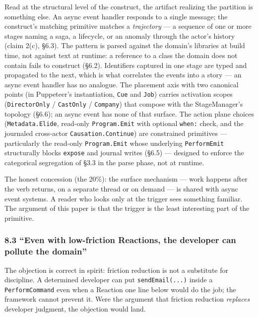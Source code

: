 \documentclass[
]{article}
\newcounter{none} %
\let\origtexttt\texttt%
\renewcommand{\texttt}[1]{\origtexttt{\seqsplit{#1}}}%
\let\texttt\origtexttt%
\begin{document}
Read at the structural level of the construct, the artifact realizing
the partition is something else. An async event handler responds to a
single message; the construct's matching primitive matches a
\emph{trajectory} --- a sequence of one or more stages naming a saga, a
lifecycle, or an anomaly through the actor's history (claim 2(c), §6.3).
The pattern is parsed against the domain's libraries at build time, not
against text at runtime: a reference to a class the domain does not
contain fails to construct (§6.2). Identifiers captured in one stage are
typed and propagated to the next, which is what correlates the events
into a story --- an async event handler has no analogue. The placement
axis with two canonical points (in Puppeteer's instantiation,
\texttt{Cue} and \texttt{Job}) carries activation scopes
(\texttt{DirectorOnly} / \texttt{CastOnly} / \texttt{Company}) that
compose with the StageManager's topology (§6.6); an async event has none
of that surface. The action plane choices (\texttt{Metadata.Elide},
read-only \texttt{Program.Emit} with optional \texttt{when:} check, and
the journaled cross-actor \texttt{Causation.Continue}) are constrained
primitives --- particularly the read-only \texttt{Program.Emit} whose
underlying \texttt{PerformEmit} structurally blocks \texttt{expose} and
journal writes (§6.5) --- designed to enforce the categorical
segregation of §3.3 in the parse phase, not at runtime.

The honest concession (the 20\%): the surface mechanism --- work happens
after the verb returns, on a separate thread or on demand --- is shared
with async event systems. A reader who looks only at the trigger sees
something familiar. The argument of this paper is that the trigger is
the least interesting part of the primitive.

\subsubsection{8.3 ``Even with low-friction Reactions, the developer can
pollute the
domain''}\label{even-with-low-friction-reactions-the-developer-can-pollute-the-domain}

The objection is correct in spirit: friction reduction is not a
substitute for discipline. A determined developer can put
\texttt{sendEmail(...)} inside a \texttt{PerformCommand} even when a
Reaction one line below would do the job; the framework cannot prevent
it. Were the argument that friction reduction \emph{replaces} developer
judgment, the objection would land.
\end{document}
